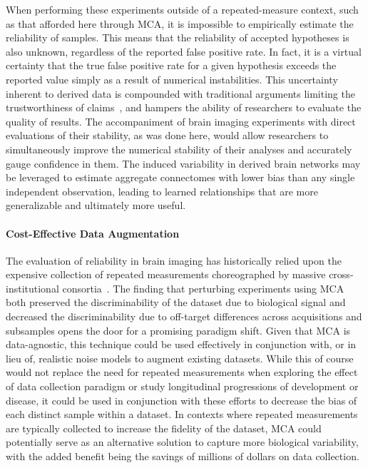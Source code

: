 \documentclass[fleqn,10pt]{SelfArx} %
\begin{document}
When performing these experiments outside of a repeated-measure context, such as that afforded here through MCA, it is
impossible to empirically estimate the reliability of samples. This means that the reliability of accepted hypotheses
is also unknown, regardless of the reported false positive rate. In fact, it is a virtual certainty that the true false
positive rate for a given hypothesis exceeds the reported value simply as a result of numerical instabilities. This
uncertainty inherent to derived data is compounded with traditional arguments limiting the trustworthiness of
claims~\cite{ioannidis2005most}, and hampers the ability of researchers to evaluate the quality of results. The
accompaniment of brain imaging experiments with direct evaluations of their stability, as was done here, would allow
researchers to simultaneously improve the numerical stability of their analyses and accurately gauge confidence in
them. The induced variability in derived brain networks may be leveraged to estimate aggregate connectomes with lower
bias than any single independent observation, leading to learned relationships that are more generalizable and
ultimately more useful.

\paragraph{Cost-Effective Data Augmentation}
The evaluation of reliability in brain imaging has historically relied upon the expensive collection of repeated
measurements choreographed by massive cross-institutional consortia~\cite{van2013wu,zuo2014open}. The finding that
perturbing experiments using MCA both preserved the discriminability of the dataset due to biological signal
and decreased the discriminability due to off-target differences across acquisitions and subsamples opens
the door for a promising paradigm shift. Given that MCA is data-agnostic, this technique
could be used effectively in conjunction with, or in lieu of, realistic noise models to augment existing datasets.
While this of course would not replace the need for repeated measurements when exploring the effect of data collection
paradigm or study longitudinal progressions of development or disease, it could be used in conjunction with these
efforts to decrease the bias of each distinct sample within a dataset. In contexts where repeated measurements
are typically collected to increase the fidelity of the dataset, MCA could potentially serve as an alternative
solution to capture more biological variability, with the added benefit being the savings of millions of dollars on
data collection. 
\end{document}
